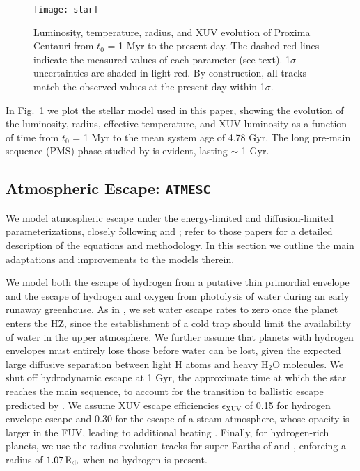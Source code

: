\documentclass[preprint,12pt]{aastex}
\def\rearth{{\rm\,R_\oplus}}
\def\atmesc{\texttt{\footnotesize{ATMESC}}\xspace}
\begin{document}
\begin{figure}[ht]
\centering
\texttt{[image: star]}
\caption{Luminosity, temperature, radius, and XUV evolution of Proxima
  Centauri from $t_0$ = 1 Myr to the present day. The dashed red lines
  indicate the measured values of each parameter (see text). 1$\sigma$
  uncertainties are shaded in light red. By construction, all tracks
  match the observed values at the present day within 1$\sigma$.}
\label{fig:stellar:evol}
\end{figure}

In Fig.~\ref{fig:stellar:evol} we plot the stellar model used in this
paper, showing the evolution of the luminosity, radius, effective
temperature, and XUV luminosity as a function of time from $t_0$ = 1
Myr to the mean system age of 4.78 Gyr. The long pre-main sequence
(PMS) phase studied by \cite{LugerBarnes15} is evident, lasting $\sim$
1 Gyr.

\subsection{Atmospheric Escape: \atmesc}
\label{sec:models:atmesc}

We model atmospheric escape under the energy-limited \citep{Watson81,Erkaev07} and
diffusion-limited \citep{Hunten73} parameterizations, closely following \cite{Luger15}
and \cite{LugerBarnes15}; refer to those papers for a detailed
description of the equations and methodology. In this section we
outline the main adaptations and improvements to the models therein.

We model both the escape of hydrogen from a putative thin primordial
envelope and the escape of hydrogen and oxygen from photolysis of
water during an early runaway greenhouse. As in \cite{LugerBarnes15},
we set water escape rates to zero once the planet enters the HZ, since
the establishment of a cold trap should limit the availability of
water in the upper atmosphere. We further assume that planets with
hydrogen envelopes must entirely lose those before water can be lost,
given the expected large diffusive separation between light H atoms
and heavy H$_2$O molecules.  We shut off hydrodynamic escape at 1 Gyr,
the approximate time at which the star reaches the main sequence, to
account for the transition to ballistic escape predicted by
\cite{OwenMohanty16}. We assume XUV escape efficiencies
$\epsilon_\mathrm{XUV}$ of 0.15 for hydrogen envelope escape and 0.30
for the escape of a steam atmosphere, whose opacity is larger in the
FUV, leading to additional heating \citep{Sekiya81}. Finally, for
hydrogen-rich planets, we use the radius evolution tracks for
super-Earths of \cite{Lopez12} and \cite{LopezFortney14}, enforcing a
radius of $1.07 \rearth$ when no hydrogen is present.
\end{document}
